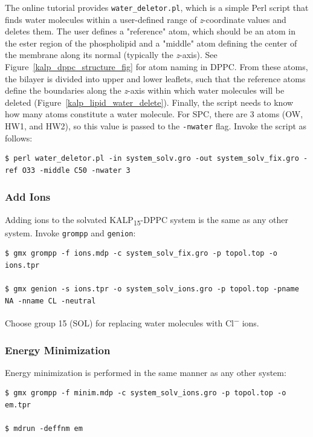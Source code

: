 \documentclass[9pt,tutorial,pubversion]{livecoms}
\begin{document}
The online tutorial provides \texttt{water\_deletor.pl}, which is a simple Perl script that finds water molecules within a user-defined range of {\em z}-coordinate values and deletes them. The user defines a "reference" atom, which should be an atom in the ester region of the phospholipid and a "middle" atom defining the center of the membrane along its normal (typically the {\em z}-axis). See Figure~\ref{kalp_dppc_structure_fig} for atom naming in DPPC. From these atoms, the bilayer is divided into upper and lower leaflets, such that the reference atoms define the boundaries along the {\em z}-axis within which water molecules will be deleted (Figure~\ref{kalp_lipid_water_delete}). Finally, the script needs to know how many atoms constitute a water molecule. For SPC, there are 3 atoms (OW, HW1, and HW2), so this value is passed to the \texttt{-nwater} flag. Invoke the script as follows:

\begin{lstlisting}
$ perl water_deletor.pl -in system_solv.gro -out system_solv_fix.gro -ref O33 -middle C50 -nwater 3
\end{lstlisting}

\subsubsection{Add Ions} \label{kalp_ions}

Adding ions to the solvated KALP\textsubscript{15}-DPPC system is the same as any other system. Invoke \texttt{grompp} and \texttt{genion}:

\begin{lstlisting}
$ gmx grompp -f ions.mdp -c system_solv_fix.gro -p topol.top -o ions.tpr

$ gmx genion -s ions.tpr -o system_solv_ions.gro -p topol.top -pname NA -nname CL -neutral
\end{lstlisting}
%
Choose group 15 (SOL) for replacing water molecules with Cl\textsuperscript{$-$} ions.

\subsubsection{Energy Minimization} \label{kalp_em}

Energy minimization is performed in the same manner as any other system:

\begin{lstlisting}
$ gmx grompp -f minim.mdp -c system_solv_ions.gro -p topol.top -o em.tpr

$ mdrun -deffnm em
\end{lstlisting}
\end{document}
